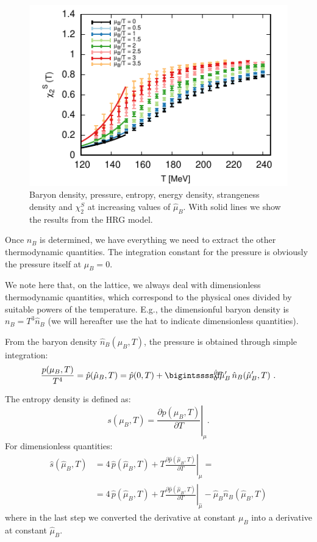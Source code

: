 \documentclass[aps,prd,twocolumn,superscriptaddress]{revtex4-2}
\newcommand \hmu {\hat{\mu}}
\begin{document}
\begin{figure}[!]
\includegraphics[width=0.49\linewidth]{figures/final_chiS2_k4.pdf}
\caption{Baryon density, pressure, entropy, energy density, strangeness density and 
$\chi_2^S$ at increasing values of $\hmu_B$. With solid lines we show the results from
the HRG model.}
\label{fig:thermo_mux}
\end{figure}

Once $n_B$ is determined, we have everything we need to extract the other 
thermodynamic quantities. The integration constant for the pressure is obviously the 
pressure itself at $\mu_B=0$.

We note here that, on the lattice, we always deal with 
dimensionless thermodynamic quantities, which 
correspond to the physical ones divided 
by suitable powers of the temperature. E.g., the 
dimensionful baryon density is 
$n_B = T^3 \hat{n}_B$ (we will hereafter use the hat to 
indicate dimensionless quantities).

From the baryon density $\hat{n}_B(\hmu_B,T)$, the pressure is 
obtained through simple integration:
\begin{equation}
\frac{p(\mu_B,T)}{T^4} = \hat{p}(\hmu_B,T) = \hat{p}(0,T) + \bigintssss_0^{\hmu_B} \!\!\!\!\!\! {\rm d} \hmu^\prime_B \, \hat{n}_B (\hmu_B^\prime,T) \, \, .
\end{equation}

The entropy density is defined as: 
\begin{equation}
s (\mu_B,T) = \left. \frac{\partial p(\mu_B,T)}{\partial T} \right|_\mu. 
\end{equation}
For dimensionless quantities:
\begin{align}
\hat{s}(\hmu_B,T) &= 4 \, \hat{p}(\hmu_B,T) + T  \left. \frac{\partial \hat{p}(\hmu_B,T)}{\partial T} \right|_{\mu} = \\ \nonumber
&= 4 \, \hat{p}(\hmu_B,T) + T  \left. \frac{\partial \hat{p}(\hmu_B,T)}{\partial T} \right|_{\hmu} - \hmu_B \hat{n}_B(\hmu_B,T)
\end{align}
where in the last step we converted the derivative 
at constant $\mu_B$ into a derivative at constant 
$\hmu_B$.
\end{document}
